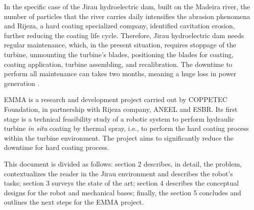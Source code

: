 In the specific case of the Jirau hydroelectric dam, built on the Madeira
river, the number of particles that the river carries daily intensifies the
abrasion phenomena and Rijeza, a hard coating specialized company, identified
cavitation erosion, further reducing the coating life cycle.
Therefore, Jirau hydroelectric dam needs regular maintenance, which,
in the present situation, requires stoppage of the turbine, unmounting the
turbine's blades, positioning the blades for coating, coating application,
turbine assembling, and recalibration. The downtime to perform all
maintenance can takes two months, meaning a huge loss in power generation .

EMMA is a research and development project carried out by COPPETEC Foundation,
in partnership with Rijeza company, ANEEL and ESBR. Its first stage is a
technical feasibility study of a robotic system to perform hydraulic turbine
\textit{in situ} coating by thermal spray, i.e., to perform the hard coating
process within the turbine environment. The project aims to significantly reduce
the downtime for hard coating process.

This document is divided as follows: section 2 describes, in detail, the
problem, contextualizes the reader in the Jirau environment and
describes the robot's tasks; section 3 surveys the state of the
art; section 4 describes the conceptual designs for the robot and mechanical
bases; finally, the section 5 concludes and outlines the next steps for the
EMMA project.
